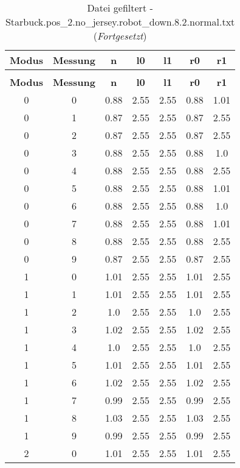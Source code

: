 \begin{longtable}{|c|c||c||c|c||c|c|}
	\caption{Datei gefiltert - Starbuck.pos\_2.no\_jersey.robot\_down.8.2.normal.txt} \label{tab:Starbuck.pos-2.no-jersey.robot-down.8.2.normal.txt} \\ \hline
	\textbf{Modus} & \textbf{Messung} & \textbf{n} & \textbf{l0} & \textbf{l1} & \textbf{r0} & \textbf{r1}\\ \hline
	\endfirsthead
	\caption[]{Datei gefiltert - Starbuck.pos\_2.no\_jersey.robot\_down.8.2.normal.txt (\emph{Fortgesetzt})} \\ \hline
	\textbf{Modus} & \textbf{Messung} & \textbf{n} & \textbf{l0} & \textbf{l1} & \textbf{r0} & \textbf{r1}\\ \hline
	\endhead
	0 & 0 & 0.88 & 2.55 & 2.55 & 0.88 & 1.01 \\ \hline
	0 & 1 & 0.87 & 2.55 & 2.55 & 0.87 & 2.55 \\ \hline
	0 & 2 & 0.87 & 2.55 & 2.55 & 0.87 & 2.55 \\ \hline
	0 & 3 & 0.88 & 2.55 & 2.55 & 0.88 & 1.0 \\ \hline
	0 & 4 & 0.88 & 2.55 & 2.55 & 0.88 & 2.55 \\ \hline
	0 & 5 & 0.88 & 2.55 & 2.55 & 0.88 & 1.01 \\ \hline
	0 & 6 & 0.88 & 2.55 & 2.55 & 0.88 & 1.0 \\ \hline
	0 & 7 & 0.88 & 2.55 & 2.55 & 0.88 & 1.01 \\ \hline
	0 & 8 & 0.88 & 2.55 & 2.55 & 0.88 & 2.55 \\ \hline
	0 & 9 & 0.87 & 2.55 & 2.55 & 0.87 & 2.55 \\ \hline
	1 & 0 & 1.01 & 2.55 & 2.55 & 1.01 & 2.55 \\ \hline
	1 & 1 & 1.01 & 2.55 & 2.55 & 1.01 & 2.55 \\ \hline
	1 & 2 & 1.0 & 2.55 & 2.55 & 1.0 & 2.55 \\ \hline
	1 & 3 & 1.02 & 2.55 & 2.55 & 1.02 & 2.55 \\ \hline
	1 & 4 & 1.0 & 2.55 & 2.55 & 1.0 & 2.55 \\ \hline
	1 & 5 & 1.01 & 2.55 & 2.55 & 1.01 & 2.55 \\ \hline
	1 & 6 & 1.02 & 2.55 & 2.55 & 1.02 & 2.55 \\ \hline
	1 & 7 & 0.99 & 2.55 & 2.55 & 0.99 & 2.55 \\ \hline
	1 & 8 & 1.03 & 2.55 & 2.55 & 1.03 & 2.55 \\ \hline
	1 & 9 & 0.99 & 2.55 & 2.55 & 0.99 & 2.55 \\ \hline
	2 & 0 & 1.01 & 2.55 & 2.55 & 1.01 & 2.55 \\ \hline

\end{longtable}
